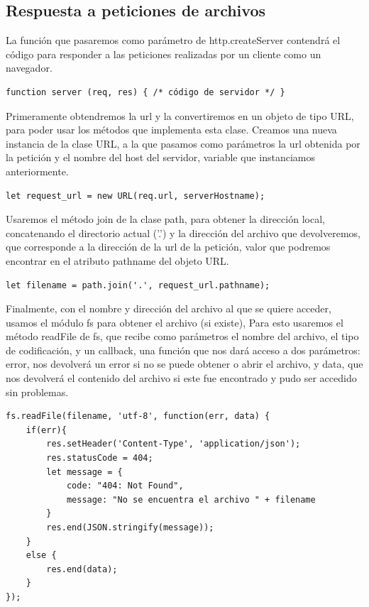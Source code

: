\documentclass[11pt]{article}
\begin{document}
\subsection{Respuesta a peticiones de archivos}
\label{sec:org67dbc50}
La función que pasaremos como parámetro de http.createServer contendrá el código
para responder a las peticiones realizadas por un cliente como un navegador.

\begin{verbatim}
function server (req, res) { /* código de servidor */ }
\end{verbatim}

Primeramente obtendremos la url y la convertiremos en un objeto de tipo URL,
para poder usar los métodos que implementa esta clase.
Creamos una nueva instancia de la clase URL, a la que pasamos como parámetros la url obtenida por la petición
y el nombre del host del servidor, variable que instanciamos anteriormente.

\begin{verbatim}
let request_url = new URL(req.url, serverHostname);
\end{verbatim}

Usaremos el método join de la clase path, para obtener la dirección local,
concatenando el directorio actual ('.') y la dirección del archivo que devolveremos,
que corresponde a la dirección de la url de la petición,
valor que podremos encontrar en el atributo pathname del objeto URL.

\begin{verbatim}
let filename = path.join('.', request_url.pathname);
\end{verbatim}

Finalmente, con el nombre y dirección del archivo al que se quiere acceder,
usamos el módulo fs para obtener el archivo (si existe),
Para esto usaremos el método readFile de fs, que recibe como parámetros el nombre del archivo,
el tipo de codificación, y un callback, una función que nos dará acceso a dos parámetros:
error, nos devolverá un error si no se puede obtener o abrir el archivo,
y data, que nos devolverá el contenido del archivo si este fue encontrado y pudo ser accedido sin problemas.

\begin{verbatim}
fs.readFile(filename, 'utf-8', function(err, data) {
    if(err){
        res.setHeader('Content-Type', 'application/json');
        res.statusCode = 404;
        let message = {
            code: "404: Not Found",
            message: "No se encuentra el archivo " + filename
        }
        res.end(JSON.stringify(message));
    }
    else {
        res.end(data);
    }
});
\end{verbatim}
\end{document}
